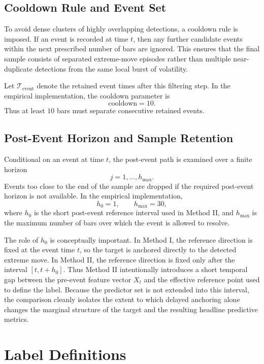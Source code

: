 \documentclass[11pt,a4paper]{article}
\begin{document}
	\subsection{Cooldown Rule and Event Set}

	To avoid dense clusters of highly overlapping detections, a cooldown rule is imposed. If an event is recorded at time \(t\), then any further candidate events within the next prescribed number of bars are ignored. This ensures that the final sample consists of separated extreme-move episodes rather than multiple near-duplicate detections from the same local burst of volatility.

	Let \(\mathcal{T}_{\mathrm{event}}\) denote the retained event times after this filtering step. In the empirical implementation, the cooldown parameter is
	\[
	\text{cooldown}=10.
	\]
	Thus at least \(10\) bars must separate consecutive retained events.

	\subsection{Post-Event Horizon and Sample Retention}

	Conditional on an event at time \(t\), the post-event path is examined over a finite horizon
	\[
	j = 1,\ldots,h_{\max}.
	\]
	Events too close to the end of the sample are dropped if the required post-event horizon is not available. In the empirical implementation,
	\[
	h_0 = 1, \qquad h_{\max} = 30,
	\]
	where \(h_0\) is the short post-event reference interval used in Method II, and \(h_{\max}\) is the maximum number of bars over which the event is allowed to resolve.

	The role of \(h_0\) is conceptually important. In Method I, the reference direction is fixed at the event time \(t\), so the target is anchored directly to the detected extreme move. In Method II, the reference direction is fixed only after the interval \([t,t+h_0]\). Thus Method II intentionally introduces a short temporal gap between the pre-event feature vector \(X_t\) and the effective reference point used to define the label. Because the predictor set is not extended into this interval, the comparison cleanly isolates the extent to which delayed anchoring alone changes the marginal structure of the target and the resulting headline predictive metrics.
	
	\section{Label Definitions}
	
\end{document}

